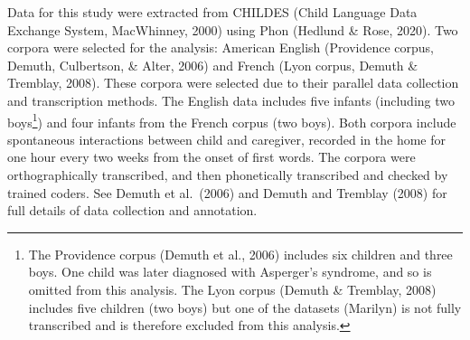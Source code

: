 \documentclass[
  english,
  man,floatsintext]{apa6}
\begin{document}
Data for this study were extracted from CHILDES (Child Language Data Exchange System, MacWhinney, 2000) using Phon (Hedlund \& Rose, 2020). Two corpora were selected for the analysis: American English (Providence corpus, Demuth, Culbertson, \& Alter, 2006) and French (Lyon corpus, Demuth \& Tremblay, 2008). These corpora were selected due to their parallel data collection and transcription methods. The English data includes five infants (including two boys\footnote{The Providence corpus (Demuth et al., 2006) includes six children and three boys. One child was later diagnosed with Asperger's syndrome, and so is omitted from this analysis. The Lyon corpus (Demuth \& Tremblay, 2008) includes five children (two boys) but one of the datasets (Marilyn) is not fully transcribed and is therefore excluded from this analysis.}) and four infants from the French corpus (two boys). Both corpora include spontaneous interactions between child and caregiver, recorded in the home for one hour every two weeks from the onset of first words. The corpora were orthographically transcribed, and then phonetically transcribed and checked by trained coders. See Demuth et al.~(2006) and Demuth and Tremblay (2008) for full details of data collection and annotation.
\end{document}
